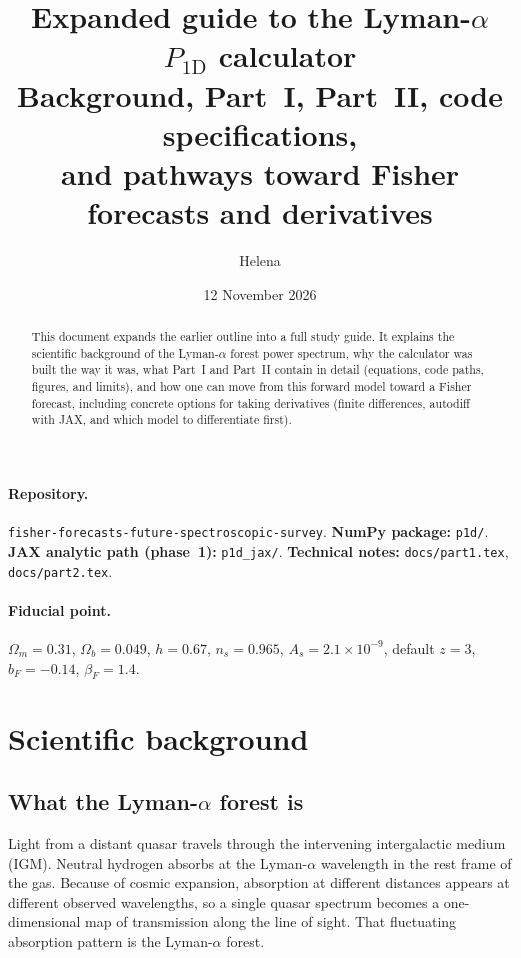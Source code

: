 \documentclass[11pt]{article}
\title{Expanded guide to the Lyman-$\alpha$ $P_{1\mathrm{D}}$ calculator\\[0.35em]
\large Background, Part~I, Part~II, code specifications,\\
and pathways toward Fisher forecasts and derivatives}
\author{Helena}
\date{12 November 2026}
\begin{document}
\maketitle

\begin{abstract}
\noindent
This document expands the earlier outline into a full study guide.
It explains the scientific background of the Lyman-$\alpha$ forest power spectrum, why the calculator was built the way it was, what Part~I and Part~II contain in detail (equations, code paths, figures, and limits), and how one can move from this forward model toward a Fisher forecast, including concrete options for taking derivatives (finite differences, autodiff with JAX, and which model to differentiate first).
\end{abstract}

\paragraph{Repository.}
\texttt{fisher-forecasts-future-spectroscopic-survey}.
\textbf{NumPy package:} \texttt{p1d/}.
\textbf{JAX analytic path (phase~1):} \texttt{p1d\_jax/}.
\textbf{Technical notes:} \texttt{docs/part1.tex}, \texttt{docs/part2.tex}.

\paragraph{Fiducial point.}
$\Omega_m=0.31$, $\Omega_b=0.049$, $h=0.67$,
$n_s=0.965$, $A_s=2.1\times 10^{-9}$,
default $z=3$, $b_F=-0.14$, $\beta_F=1.4$.

\tableofcontents
\newpage

\section{Scientific background}

\subsection{What the Lyman-$\alpha$ forest is}

Light from a distant quasar travels through the intervening intergalactic medium (IGM).
Neutral hydrogen absorbs at the Lyman-$\alpha$ wavelength in the rest frame of the gas.
Because of cosmic expansion, absorption at different distances appears at different observed wavelengths, so a single quasar spectrum becomes a one-dimensional map of transmission along the line of sight.
That fluctuating absorption pattern is the Lyman-$\alpha$ forest.
\end{document}
